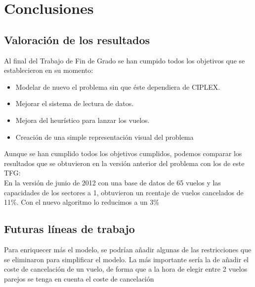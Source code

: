 \chapter{Conclusiones}
\section{Valoración de los resultados}
Al final del Trabajo de Fin de Grado se han cumpido todos los objetivos que se establecieron en su momento:
\begin{itemize}
	\item Modelar de nuevo el problema sin que éste dependiera de CIPLEX.
	\item Mejorar el sistema de lectura de datos.
	\item Mejora del heurístico para lanzar los vuelos.
	\item Creación de una simple representación visual del problema
\end{itemize}
Aunque se han cumplido todos los objetivos cumplidos, podemos comparar los resultados que se obtuvieron en la versión anterior del problema con los de este TFG:\\
En la versión de junio de 2012 con una base de datos de 65 vuelos y las capacidades de los sectores a 1, obtuvieron un rcentaje de vuelos cancelados de 11\%. Con el nuevo algoritmo lo reducimos a un 3\%
\section{Futuras líneas de trabajo}
Para enriquecer más el modelo, se podrían añadir algunas de las restricciones que se eliminaron para simplificar el modelo. La más importante sería la de añadir el coste de cancelación de un vuelo, de forma que a la hora de elegir entre 2 vuelos parejos se tenga en cuenta el coste de cancelación


